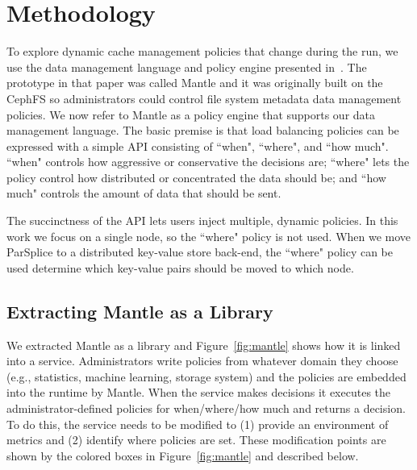 \section{Methodology}

To explore dynamic cache management policies that change during the run, we use
the data management language and policy engine presented
in~\cite{sevilla:sc15-mantle}. The prototype in that paper was called Mantle
and it was originally built on the CephFS so administrators could control file
system metadata data management policies. We now refer to Mantle as a policy
engine that supports our data management language.  The basic premise is that
load balancing policies can be expressed with a simple API consisting of
``when", ``where", and ``how much". ``when" controls how aggressive or
conservative the decisions are; ``where" lets the policy control how
distributed or concentrated the data should be; and ``how much" controls the
amount of data that should be sent.

The succinctness of the API lets users inject multiple, dynamic policies. In
this work we focus on a single node, so the ``where" policy is not used. When
we move ParSplice to a distributed key-value store back-end, the ``where" policy
can be used determine which key-value pairs should be moved to which node.

\subsection{Extracting Mantle as a Library}
\label{sec:extracting}


We extracted Mantle as a library and Figure~\ref{fig:mantle} shows how it is
linked into a service.  Administrators write policies from whatever domain they
choose ({e.g.}, statistics, machine learning, storage system) and the policies
are embedded into the runtime by Mantle. When the service makes decisions it
executes the administrator-defined policies for when/where/how much and returns
a decision.  To do this, the service needs to be modified to (1) provide an
environment of metrics and (2) identify where policies are set. These
modification points are shown by the colored boxes in Figure~\ref{fig:mantle}
and described below.


